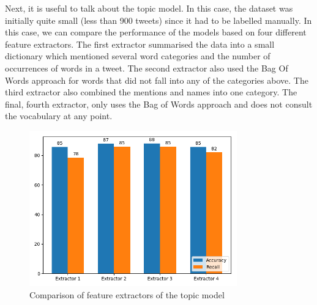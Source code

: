Next, it is useful to talk about the topic model. In this case, the dataset was initially quite small (less than 900 tweets) since it had to be labelled manually. In this case, we can compare the performance of the models based on four different feature extractors. 
The first extractor summarised the data into a small dictionary which mentioned several word categories and the number of occurrences of words in a tweet. The second extractor also used the Bag Of Words approach for words that did not fall into any of the categories above. The third extractor also combined the mentions and names into one category. The final, fourth extractor, only uses the Bag of Words approach and does not consult the vocabulary at any point.

\begin{figure}[ht]
    \centering
    \includegraphics[width=0.8\textwidth]{topic}
    \caption{Comparison of feature extractors of the topic model}
    \label{fig:topicm}
\end{figure}

